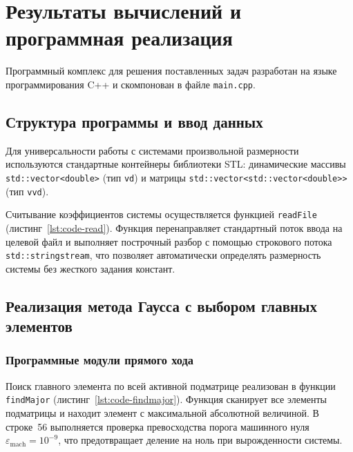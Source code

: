 \chapter{Результаты вычислений и программная реализация}

Программный комплекс для решения поставленных задач разработан на языке программирования C++ и скомпонован в файле \texttt{main.cpp}.

\section{Структура программы и ввод данных}

Для универсальности работы с системами произвольной размерности используются стандартные контейнеры библиотеки STL: динамические массивы \texttt{std::vector<double>} (тип \texttt{vd}) и матрицы \texttt{std::vector<std::vector<double>>} (тип \texttt{vvd}).

Считывание коэффициентов системы осуществляется функцией \texttt{readFile} (листинг~\ref{lst:code-read}). Функция перенаправляет стандартный поток ввода на целевой файл и выполняет построчный разбор с помощью строкового потока \texttt{std::stringstream}, что позволяет автоматически определять размерность системы без жесткого задания констант.

\begin{listing}[H]
    \caption{Функция readFile для универсального считывания матрицы}
    \label{lst:code-read}
\end{listing}

\section{Реализация метода Гаусса с выбором главных элементов}

\subsection{Программные модули прямого хода}

Поиск главного элемента по всей активной подматрице реализован в функции \texttt{findMajor} (листинг~\ref{lst:code-findmajor}). Функция сканирует все элементы подматрицы и находит элемент с максимальной абсолютной величиной. В строке~56 выполняется проверка превосходства порога машинного нуля $\varepsilon_{\text{mach}} = 10^{-9}$, что предотвращает деление на ноль при вырожденности системы.

